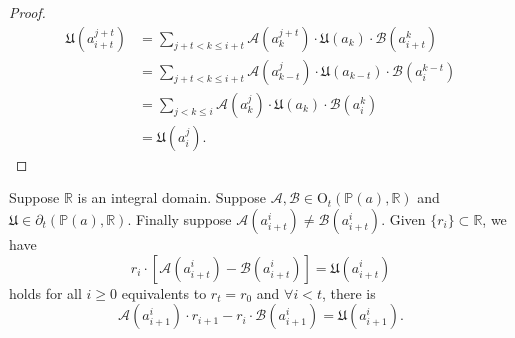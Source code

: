 \begin{proof}
    \begin{align*}
        \mathfrak{U}(a_{i+t}^{j+t}) &= \sum_{j+t< k \le i+t}\mathcal{A}(a_{k}^{j+t})\cdot\mathfrak{U}(a_{k})\cdot\mathcal{B}(a_{i+t}^{k}) \\
        &= \sum_{j+t< k \le i+t}\mathcal{A}(a_{k-t}^{j})\cdot\mathfrak{U}(a_{k-t})\cdot\mathcal{B}(a_{i}^{k-t}) \\
        &= \sum_{j< k \le i}\mathcal{A}(a_{k}^{j})\cdot\mathfrak{U}(a_{k})\cdot\mathcal{B}(a_{i}^{k}) \\
        &= \mathfrak{U}(a_{i}^{j}).
    \end{align*}
\end{proof}
\begin{theorem}\label{thm:derivation-periodic-rule}
    Suppose $\mathbb{R}$ is an integral domain. Suppose $\mathcal{A}, \mathcal{B} \in \mathrm{O}_{t}(\mathbb{P}(a), \mathbb{R})$ and $\mathfrak{U}\in\partial_{t}(\mathbb{P}(a), \mathbb{R})$. Finally suppose $\mathcal{A}(a_{i+t}^{i}) \ne \mathcal{B}(a_{i+t}^{i})$. Given $\{r_{i}\}\subset\mathbb{R}$, we have
    \[ r_i\cdot \left[\mathcal{A}(a_{i+t}^{i}) - \mathcal{B}(a_{i+t}^{i})\right] = \mathfrak{U}(a_{i+t}^{i}) \]
    holds for all $i\ge 0$ equivalents to $r_t =r_0$ and $\forall i < t$, there is
    \[ \mathcal{A}(a_{i+1}^{i})\cdot r_{i+1} - r_i\cdot\mathcal{B}(a_{i+1}^{i}) = \mathfrak{U}(a_{i+1}^{i}). \]
\end{theorem}
